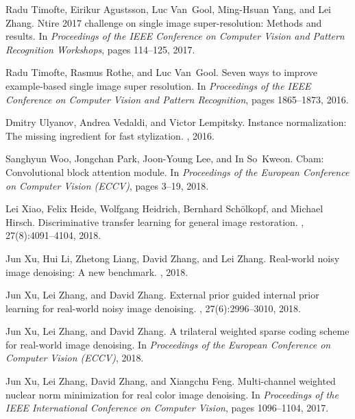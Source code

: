 \documentclass[10pt,twocolumn,letterpaper]{article}
\begin{document}
{\begin{thebibliography}{10}
	Radu Timofte, Eirikur Agustsson, Luc Van~Gool, Ming-Hsuan Yang, and Lei Zhang.
	\newblock Ntire 2017 challenge on single image super-resolution: Methods and
	results.
	\newblock In {\em Proceedings of the IEEE Conference on Computer Vision and
		Pattern Recognition Workshops}, pages 114--125, 2017.
	
	Radu Timofte, Rasmus Rothe, and Luc Van~Gool.
	\newblock Seven ways to improve example-based single image super resolution.
	\newblock In {\em Proceedings of the IEEE Conference on Computer Vision and
		Pattern Recognition}, pages 1865--1873, 2016.
	
	Dmitry Ulyanov, Andrea Vedaldi, and Victor Lempitsky.
	\newblock Instance normalization: The missing ingredient for fast stylization.
	, 2016.
	
	Sanghyun Woo, Jongchan Park, Joon-Young Lee, and In So~Kweon.
	\newblock Cbam: Convolutional block attention module.
	\newblock In {\em Proceedings of the European Conference on Computer Vision
		(ECCV)}, pages 3--19, 2018.
	
	Lei Xiao, Felix Heide, Wolfgang Heidrich, Bernhard Sch{\"o}lkopf, and Michael
	Hirsch.
	\newblock Discriminative transfer learning for general image restoration.
	, 27(8):4091--4104, 2018.
	
	Jun Xu, Hui Li, Zhetong Liang, David Zhang, and Lei Zhang.
	\newblock Real-world noisy image denoising: A new benchmark.
	, 2018.
	
	Jun Xu, Lei Zhang, and David Zhang.
	\newblock External prior guided internal prior learning for real-world noisy
	image denoising.
	, 27(6):2996--3010, 2018.
	
	Jun Xu, Lei Zhang, and David Zhang.
	\newblock A trilateral weighted sparse coding scheme for real-world image
	denoising.
	\newblock In {\em Proceedings of the European Conference on Computer Vision
		(ECCV)}, 2018.
	
	Jun Xu, Lei Zhang, David Zhang, and Xiangchu Feng.
	\newblock Multi-channel weighted nuclear norm minimization for real color image
	denoising.
	\newblock In {\em Proceedings of the IEEE International Conference on Computer
		Vision}, pages 1096--1104, 2017.
	

\end{thebibliography}}
\end{document}
